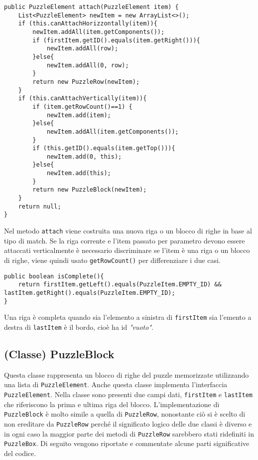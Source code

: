 \documentclass[a4paper, 11pt]{article}
\begin{document}
\begin{lstlisting}
public PuzzleElement attach(PuzzleElement item) {
    List<PuzzleElement> newItem = new ArrayList<>();
    if (this.canAttachHorizzontally(item)){
        newItem.addAll(item.getComponents());
        if (firstItem.getID().equals(item.getRight())){
            newItem.addAll(row);
        }else{
            newItem.addAll(0, row);
        }
        return new PuzzleRow(newItem);
    }
    if (this.canAttachVertically(item)){
        if (item.getRowCount()==1) {
            newItem.add(item);
        }else{
            newItem.addAll(item.getComponents());
        }
        if (this.getID().equals(item.getTop())){
            newItem.add(0, this);
        }else{
            newItem.add(this);
        }
        return new PuzzleBlock(newItem);
    }
    return null;
}
\end{lstlisting}
Nel metodo \texttt{attach} viene costruita una nuova riga o un blocco di righe in base al tipo di match.
Se la riga corrente e l'item passato per parametro devono essere attaccati verticalmente è necessario discriminare se l'item è una riga o un blocco di righe, viene quindi usato \texttt{getRowCount()} per differenziare i due casi.

\begin{lstlisting}
public boolean isComplete(){
    return firstItem.getLeft().equals(PuzzleItem.EMPTY_ID) && lastItem.getRight().equals(PuzzleItem.EMPTY_ID);
}
\end{lstlisting}
Una riga è completa quando sia l'elemento a sinistra di \texttt{firstItem} sia l'emento a destra di \texttt{lastItem} è il bordo, cioè ha id \textit{"vuoto"}.

\subsection{(Classe) PuzzleBlock}

Questa classe rappresenta un blocco di righe del puzzle memorizzate utilizzando una lista di \texttt{PuzzleElement}.
Anche questa classe implementa l'interfaccia \texttt{PuzzleElement}.
Nella classe sono presenti due campi dati, \texttt{firstItem} e \texttt{lastItem} che riferiscono la prima e ultima riga del blocco.
L'implementazione di \texttt{PuzzleBlock} è molto simile a quella di \texttt{PuzzleRow}, nonostante ciò si è scelto di non ereditare da \texttt{PuzzleRow} perché il significato logico delle due classi è diverso e in ogni caso la maggior parte dei metodi di \texttt{PuzzleRow} sarebbero stati ridefiniti in \texttt{PuzzleBox}. 
Di seguito vengono riportate e commentate alcune parti significative del codice.
\end{document}
